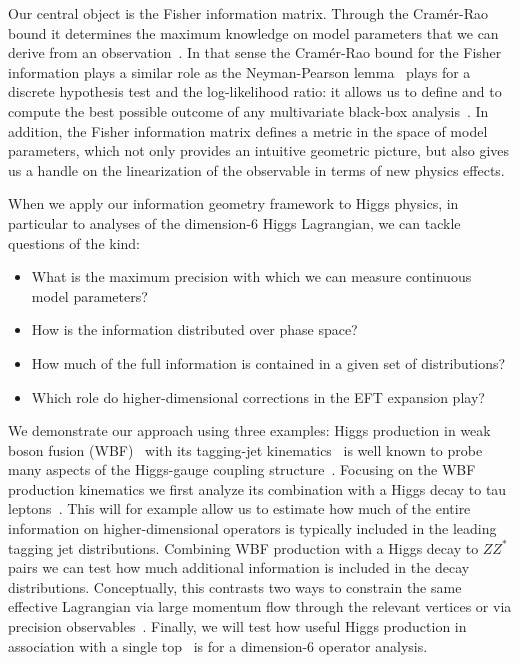 Our central object is the Fisher information matrix. Through the
Cram\'er-Rao bound it determines the maximum knowledge on model
parameters that we can derive from an
observation~\cite{cramer-rao,information-applications}. In that sense the
Cram\'er-Rao bound for the Fisher information plays a similar role as
the Neyman-Pearson lemma~\cite{neyman-pearson} plays for a discrete
hypothesis test and the log-likelihood ratio: it allows us to define
and to compute the best possible outcome of any multivariate black-box
analysis~\cite{kyle_review,madmax1}. In addition, the Fisher
information matrix defines a metric in the space of model parameters,
which not only provides an intuitive geometric picture, but also gives
us a handle on the linearization of the observable in terms of new
physics effects.

When we apply our information geometry framework to Higgs physics, in
particular to analyses of the dimension-6 Higgs Lagrangian, we can
tackle questions of the kind:
%
\begin{itemize}[label=\raisebox{0.1ex}{\scriptsize$\bullet$}]
\item What is the maximum precision with which we can measure
  continuous model parameters?
\item How is the information distributed over phase space?
\item How much of the full information is contained in a given set of
  distributions?
\item Which role do higher-dimensional corrections in the EFT
  expansion play?
\end{itemize}
%


We demonstrate our approach using three examples: Higgs production in
weak boson fusion (WBF)~\cite{dave_thesis} with its tagging-jet
kinematics~\cite{tagging} is well known to probe many aspects of the
Higgs-gauge coupling structure~\cite{phi_jj}. Focusing on the WBF
production kinematics we first analyze its combination with a Higgs
decay to tau leptons~\cite{wbf_tau}. This will for example allow us to
estimate how much of the entire information on higher-dimensional
operators is typically included in the leading tagging jet
distributions. Combining WBF production with a Higgs decay to $ZZ^*$
pairs we can test how much additional information is included in the
decay distributions. Conceptually, this contrasts two ways to
constrain the same effective Lagrangian via large momentum flow
through the relevant vertices or via precision observables~\cite{higgs_fit}.
Finally, we will test how useful Higgs production in association with
a single top~\cite{top_higgs} is for a dimension-6 operator analysis.


